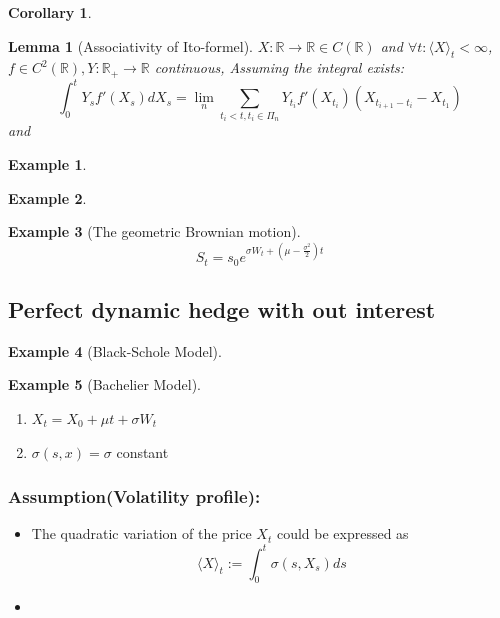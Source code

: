 \documentclass[a4paper,11pt]{book}
\newtheorem{corollary}{Corollary}[theorem]
\newtheorem{lemma}[theorem]{Lemma}
\theoremstyle{definition}
\newtheorem*{example}{Example}
\theoremstyle{remark}
\begin{document}
\begin{corollary}
\end{corollary}

\begin{lemma}[Associativity of Ito-formel]
	$X: \mathbb{R} \rightarrow \mathbb{R} \in C(\mathbb{R})$ and $\forall t: \langle X \rangle_t < \infty $, $f \in C^2(\mathbb{R}), Y: \mathbb{R}_+ \rightarrow \mathbb{R}$ continuous, Assuming the integral exists:
	\begin{equation*}
		\int_0^t Y_s f'(X_s)dX_s = \lim_n \sum_{t_i < t, t_i \in \Pi_n} Y_{t_i}f'(X_{t_i}) (X_{t_{i+1} - t_i} - X_{t_1})
	\end{equation*}
	and 
\end{lemma}


\begin{example}
\end{example}

\begin{example}	
\end{example}

\begin{example}[The geometric Brownian motion]
\begin{equation*}
	S_t = s_0 e^{\sigma W_t + (\mu - \frac{\sigma^2}{2})t}
\end{equation*}
\end{example}


\subsection{Perfect dynamic hedge with out interest}
\begin{example}[Black-Schole Model]	
\end{example}

\begin{example}[Bachelier Model] \quad
\begin{enumerate}
	\item $X_t = X_0 + \mu t + \sigma W_t$
	\item $\sigma(s, x) = \sigma$ constant
\end{enumerate}
\end{example}

\subsubsection*{Assumption(Volatility profile):}
\begin{itemize}
	\item The quadratic variation of the price $X_t$ could be expressed as
\begin{equation*}
	\langle X \rangle_t := \int_0^t \sigma(s, X_s) ds
\end{equation*}
	\item 
\end{itemize}
\end{document}
